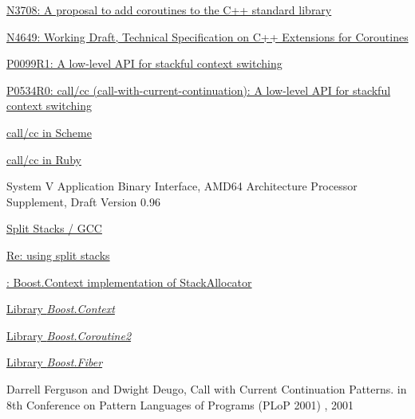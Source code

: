 \begin{thebibliography}{99}

        \href{http://www.open-std.org/jtc1/sc22/wg21/docs/papers/2013/n3708.pdf}
        {N3708: A proposal to add coroutines to the C++ standard library}

        \href{http://www.open-std.org/jtc1/sc22/wg21/docs/papers/2017/n4649.pdf}
        {N4649: Working Draft, Technical Specification on C++ Extensions for Coroutines}

        \href{http://www.open-std.org/jtc1/sc22/wg21/docs/papers/2016/p0099r1.pdf}
        {P0099R1: A low-level API for stackful context switching}

        \href{http://www.open-std.org/jtc1/sc22/wg21/docs/papers/2017/p0534r0.pdf}
        {P0534R0: call/cc (call-with-current-continuation): A low-level API for stackful
        context switching}

        \href{http://community.schemewiki.org/?call-with-current-continuation}
        {call/cc in Scheme}

        \href{http://gnuu.org/2009/03/21/demystifying-continuations-in-ruby}
        {call/cc in Ruby}

        {System V Application Binary Interface, AMD64 Architecture Processor Supplement,
        Draft Version 0.96}

        \href{http://gcc.gnu.org/wiki/SplitStacks}
        {Split Stacks / GCC}

        \href{https://gcc.gnu.org/ml/gcc-help/2012-03/msg00395.html}
        {Re: using split stacks}

        \href{https://github.com/boostorg/context/blob/master/include/boost/context/posix/segmented_stack.hpp}
        {: Boost.Context implementation
        of  StackAllocator}

        \href{http://www.boost.org/doc/libs/release/libs/context/doc/html/index.html}
        {Library \emph{Boost.Context}}

        \href{http://www.boost.org/doc/libs/release/libs/coroutine2/doc/html/index.html}
        {Library \emph{Boost.Coroutine2}}

        \href{http://www.boost.org/doc/libs/release/libs/fiber/doc/html/index.html}
        {Library \emph{Boost.Fiber}}

        {Darrell Ferguson and Dwight Deugo, Call with Current Continuation Patterns.
        in 8th Conference on Pattern Languages of Programs (PLoP 2001) , 2001}

\end{thebibliography}
